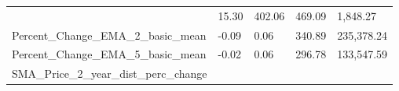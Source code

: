 \documentclass[]{article}
\begin{document}
\begin{longtable}[]{@{}lllll@{}}
\begin{minipage}[t]{0.49\columnwidth}
\end{minipage} & \begin{minipage}[t]{0.08\columnwidth}\raggedright\strut
15.30\strut
\end{minipage} & \begin{minipage}[t]{0.09\columnwidth}\raggedright\strut
402.06\strut
\end{minipage} & \begin{minipage}[t]{0.09\columnwidth}\raggedright\strut
469.09\strut
\end{minipage} & \begin{minipage}[t]{0.11\columnwidth}\raggedright\strut
1,848.27\strut
\end{minipage}\tabularnewline
\begin{minipage}[t]{0.49\columnwidth}\raggedright\strut
Percent\_Change\_EMA\_2\_basic\_mean\strut
\end{minipage} & \begin{minipage}[t]{0.08\columnwidth}\raggedright\strut
-0.09\strut
\end{minipage} & \begin{minipage}[t]{0.09\columnwidth}\raggedright\strut
0.06\strut
\end{minipage} & \begin{minipage}[t]{0.09\columnwidth}\raggedright\strut
340.89\strut
\end{minipage} & \begin{minipage}[t]{0.11\columnwidth}\raggedright\strut
235,378.24\strut
\end{minipage}\tabularnewline
\begin{minipage}[t]{0.49\columnwidth}\raggedright\strut
Percent\_Change\_EMA\_5\_basic\_mean\strut
\end{minipage} & \begin{minipage}[t]{0.08\columnwidth}\raggedright\strut
-0.02\strut
\end{minipage} & \begin{minipage}[t]{0.09\columnwidth}\raggedright\strut
0.06\strut
\end{minipage} & \begin{minipage}[t]{0.09\columnwidth}\raggedright\strut
296.78\strut
\end{minipage} & \begin{minipage}[t]{0.11\columnwidth}\raggedright\strut
133,547.59\strut
\end{minipage}\tabularnewline
\begin{minipage}[t]{0.49\columnwidth}\raggedright\strut
SMA\_Price\_2\_year\_dist\_perc\_change\strut

\end{minipage}
\end{longtable}
\end{document}
